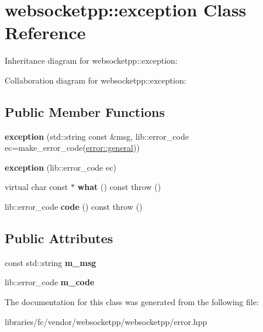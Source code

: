 \hypertarget{classwebsocketpp_1_1exception}{}\section{websocketpp\+:\+:exception Class Reference}
\label{classwebsocketpp_1_1exception}


Inheritance diagram for websocketpp\+:\+:exception\+:


Collaboration diagram for websocketpp\+:\+:exception\+:
\subsection*{Public Member Functions}
\begin{DoxyCompactItemize}
\item 
\mbox{\label{classwebsocketpp_1_1exception_af95696b245ec29c38666bf6ac00e95b2}} 
{\bfseries exception} (std\+::string const \&msg, lib\+::error\+\_\+code ec=make\+\_\+error\+\_\+code(\mbox{\hyperlink{namespacewebsocketpp_1_1error_a0558d884e44e79146ad4947aea63f68da0cd3808919f43e5fbeee42fbcb808d66}{error\+::general}}))
\item 
\mbox{\label{classwebsocketpp_1_1exception_aa90a59ff911af87c912fde8ff4d44c92}} 
{\bfseries exception} (lib\+::error\+\_\+code ec)
\item 
\mbox{\label{classwebsocketpp_1_1exception_af774ced1072583eff949c307ff115922}} 
virtual char const  $\ast$ {\bfseries what} () const  throw ()
\item 
\mbox{\label{classwebsocketpp_1_1exception_a2ca743bae5d6ba2be63d1a64bc2f878f}} 
lib\+::error\+\_\+code {\bfseries code} () const  throw ()
\end{DoxyCompactItemize}
\subsection*{Public Attributes}
\begin{DoxyCompactItemize}
\item 
\mbox{\label{classwebsocketpp_1_1exception_a6a739f94138be314aaac2ef3b5e5b467}} 
const std\+::string {\bfseries m\+\_\+msg}
\item 
\mbox{\label{classwebsocketpp_1_1exception_ab34949df4a66b0ac7c3f2928364c85c7}} 
lib\+::error\+\_\+code {\bfseries m\+\_\+code}
\end{DoxyCompactItemize}


The documentation for this class was generated from the following file\+:\begin{DoxyCompactItemize}
\item 
libraries/fc/vendor/websocketpp/websocketpp/error.\+hpp\end{DoxyCompactItemize}
